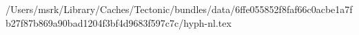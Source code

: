 /Users/msrk/Library/Caches/Tectonic/bundles/data/6ffe055852f8faf66c0acbe1a7fb27f87b869a90bad1204f3bf4d9683f597c7c/hyph-nl.tex